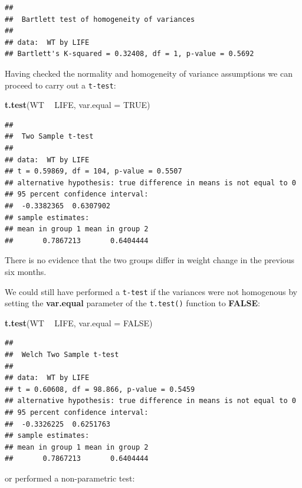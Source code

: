\documentclass[]{book}
\newenvironment{Shaded}{\begin{snugshade}}{\end{snugshade}}
\newcommand{\KeywordTok}[1]{\textcolor[rgb]{0.13,0.29,0.53}{\textbf{#1}}}
\newcommand{\DataTypeTok}[1]{\textcolor[rgb]{0.13,0.29,0.53}{#1}}
\newcommand{\StringTok}[1]{\textcolor[rgb]{0.31,0.60,0.02}{#1}}
\newcommand{\OtherTok}[1]{\textcolor[rgb]{0.56,0.35,0.01}{#1}}
\newcommand{\OperatorTok}[1]{\textcolor[rgb]{0.81,0.36,0.00}{\textbf{#1}}}
\newcommand{\NormalTok}[1]{#1}
\theoremstyle{definition}
\theoremstyle{definition}
\theoremstyle{definition}
\theoremstyle{remark}
\begin{document}
\begin{verbatim}
## 
##  Bartlett test of homogeneity of variances
## 
## data:  WT by LIFE
## Bartlett's K-squared = 0.32408, df = 1, p-value = 0.5692
\end{verbatim}

Having checked the normality and homogeneity of variance assumptions we
can proceed to carry out a \texttt{t-test}:

\begin{Shaded}
\begin{Highlighting}[]
\KeywordTok{t.test}\NormalTok{(WT }\OperatorTok{~}\StringTok{ }\NormalTok{LIFE, }\DataTypeTok{var.equal =} \OtherTok{TRUE}\NormalTok{)}
\end{Highlighting}
\end{Shaded}

\begin{verbatim}
## 
##  Two Sample t-test
## 
## data:  WT by LIFE
## t = 0.59869, df = 104, p-value = 0.5507
## alternative hypothesis: true difference in means is not equal to 0
## 95 percent confidence interval:
##  -0.3382365  0.6307902
## sample estimates:
## mean in group 1 mean in group 2 
##       0.7867213       0.6404444
\end{verbatim}

There is no evidence that the two groups differ in weight change in the
previous six months.

We could still have performed a \texttt{t-test} if the variances were
not homogenous by setting the \textbf{var.equal} parameter of the
\texttt{t.test()} function to \textbf{FALSE}:

\begin{Shaded}
\begin{Highlighting}[]
\KeywordTok{t.test}\NormalTok{(WT }\OperatorTok{~}\StringTok{ }\NormalTok{LIFE, }\DataTypeTok{var.equal =} \OtherTok{FALSE}\NormalTok{)}
\end{Highlighting}
\end{Shaded}

\begin{verbatim}
## 
##  Welch Two Sample t-test
## 
## data:  WT by LIFE
## t = 0.60608, df = 98.866, p-value = 0.5459
## alternative hypothesis: true difference in means is not equal to 0
## 95 percent confidence interval:
##  -0.3326225  0.6251763
## sample estimates:
## mean in group 1 mean in group 2 
##       0.7867213       0.6404444
\end{verbatim}

or performed a non-parametric test:
\end{document}
